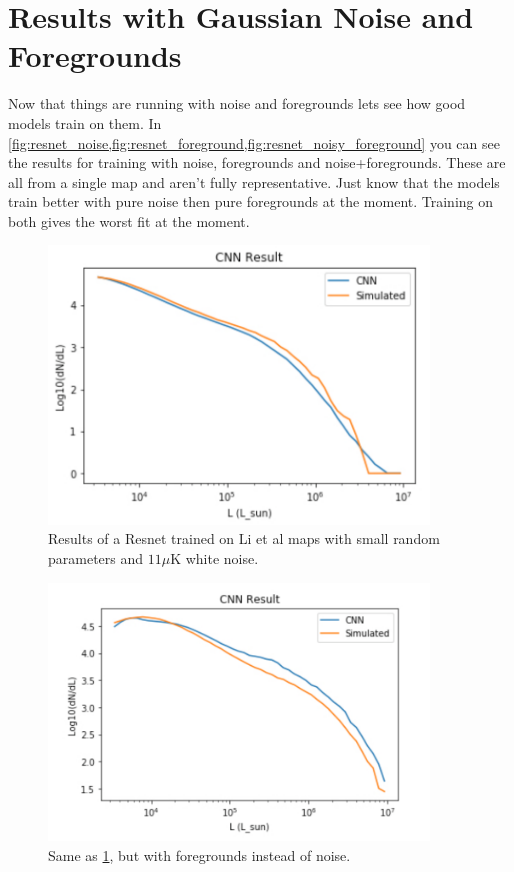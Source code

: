 \documentclass{article}
\begin{document}
	\section{Results with Gaussian Noise and Foregrounds } \label{sec:res_with_noise}
		Now that things are running with noise and foregrounds lets see how good models train on them.  In \cref{fig:resnet_noise,fig:resnet_foreground,fig:resnet_noisy_foreground} you can see the results for training with noise, foregrounds and noise+foregrounds.  These are all from a single map and aren't fully representative.  Just know that the models train better with pure noise then pure foregrounds at the moment.  Training on both gives the worst fit at the moment.

		\begin{figure}[H]
			\centering
			\includegraphics[width=0.9\textwidth]{resnet_noise.pdf}
			\caption{Results of a Resnet trained on Li et al maps with small random parameters and \(11 \mu\)K white noise.}
			\label{fig:resnet_noise}
		\end{figure}

		\begin{figure}[H]
			\centering
			\includegraphics[width=0.9\textwidth]{resnet_foreground.pdf}
			\caption{Same as \cref{fig:resnet_noise}, but with foregrounds instead of noise.}
			\label{fig:resnet_foreground}
		\end{figure}
\end{document}

